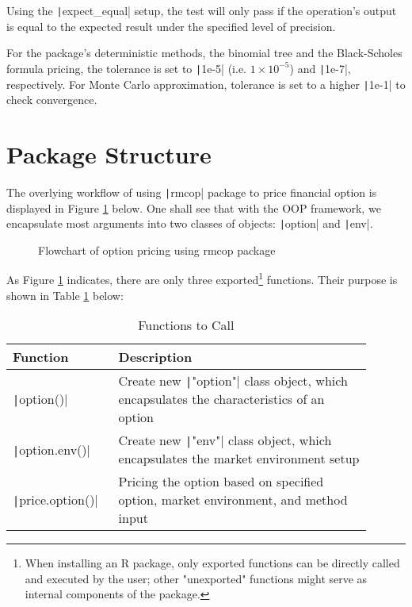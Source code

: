 Using the \texttt|expect_equal| setup, the test will only pass if the operation's output is equal to the expected result under the specified level of precision.

For the package's deterministic methods, the binomial tree and the Black-Scholes formula pricing, the tolerance is set to \texttt|1e-5| (i.e. $1\times10^{-5}$) and \texttt|1e-7|, respectively. For Monte Carlo approximation, tolerance is set to a higher \texttt|1e-1| to check convergence.

\section{Package Structure} \label{sec:Pkg Structure}

The overlying workflow of using \texttt|rmcop| package to price financial option is displayed in Figure \ref{img:flowchart_option} below. One shall see that with the OOP framework, we encapsulate most arguments into two classes of objects: \texttt|option| and \texttt|env|.

\begin{figure}[H]
    \centering
    
    \caption{Flowchart of option pricing using rmcop package} \label{img:flowchart_option}
\end{figure}

As Figure \ref{img:flowchart_option} indicates, there are only three exported\footnote{When installing an R package, only exported functions can be directly called and executed by the user; other "unexported" functions might serve as internal components of the package.} functions. Their purpose is shown in Table \ref{tab:pkg_functions} below:

\begin{table}[H]
    \begin{tabular}{p{0.25\linewidth} | p{0.65\linewidth}}
    Function                            & Description \\ \hline
    \texttt|option()|            & Create new \texttt|"option"| class object, which encapsulates the characteristics of an option \\
    \texttt|option.env()|        & Create new \texttt|"env"| class object, which encapsulates the market environment setup \\
    \texttt|price.option()|      & Pricing the option based on specified option, market environment, and method input                       
    \end{tabular}
    \caption{Functions to Call} \label{tab:pkg_functions}
\end{table}
    
